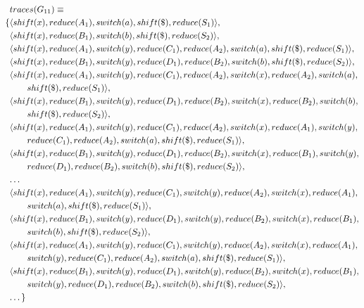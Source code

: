 \documentclass[a4paper,11pt]{article}
\begin{document}
{\small\parbox{\textwidth}{\begin{align*}
&traces(G_{11}) \equiv \\
\{ & \langle shift(x), reduce(A_1), switch(a), shift(\$), reduce(S_1) \rangle,\\
   & \langle shift(x), reduce(B_1), switch(b), shift(\$), reduce(S_2) \rangle,\\
   & \langle shift(x), reduce(A_1), switch(y), reduce(C_1), reduce(A_2), switch(a), shift(\$), reduce(S_1) \rangle,\\
   & \langle shift(x), reduce(B_1), switch(y), reduce(D_1), reduce(B_2), switch(b), shift(\$), reduce(S_2) \rangle,\\
   & \langle shift(x), reduce(A_1), switch(y), reduce(C_1), reduce(A_2), switch(x), reduce(A_2), switch(a), \\ & \qquad shift(\$), reduce(S_1) \rangle,\\
   & \langle shift(x), reduce(B_1), switch(y), reduce(D_1), reduce(B_2), switch(x), reduce(B_2), switch(b), \\ & \qquad shift(\$), reduce(S_2) \rangle,\\
   & \langle shift(x), reduce(A_1), switch(y), reduce(C_1), reduce(A_2), switch(x), reduce(A_1), switch(y), \\ & \qquad reduce(C_1), reduce(A_2), switch(a), shift(\$), reduce(S_1) \rangle,\\
   & \langle shift(x), reduce(B_1), switch(y), reduce(D_1), reduce(B_2), switch(x), reduce(B_1), switch(y), \\ & \qquad reduce(D_1), reduce(B_2), switch(b), shift(\$), reduce(S_2) \rangle,\\
   & \textellipsis \\
   & \langle shift(x), reduce(A_1), switch(y), reduce(C_1), switch(y), reduce(A_2), switch(x), reduce(A_1), \\ & \qquad switch(a), shift(\$), reduce(S_1) \rangle,\\
   & \langle shift(x), reduce(B_1), switch(y), reduce(D_1), switch(y), reduce(B_2), switch(x), reduce(B_1), \\ & \qquad switch(b), shift(\$), reduce(S_2) \rangle,\\
   & \langle shift(x), reduce(A_1), switch(y), reduce(C_1), switch(y), reduce(A_2), switch(x), reduce(A_1), \\ & \qquad switch(y), reduce(C_1), reduce(A_2), switch(a), shift(\$), reduce(S_1) \rangle,\\
   & \langle shift(x), reduce(B_1), switch(y), reduce(D_1), switch(y), reduce(B_2), switch(x), reduce(B_1), \\ & \qquad switch(y), reduce(D_1), reduce(B_2), switch(b), shift(\$), reduce(S_2) \rangle,\\
   & \textellipsis \}
\end{align*}}}
\end{document}
